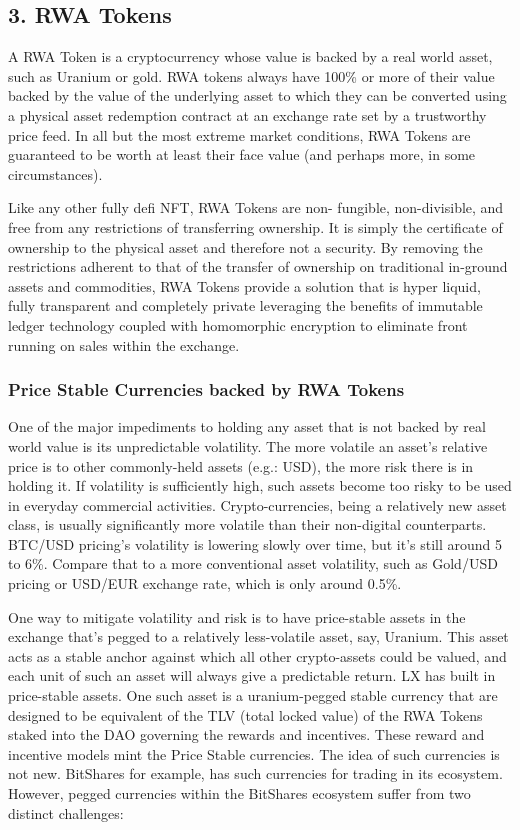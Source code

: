 \documentclass[11pt]{article}
\begin{document}
\subsection{3. RWA Tokens}

A RWA Token is a cryptocurrency whose value is backed by a real world asset, such as Uranium or gold. RWA tokens always have 100\% or more of their value backed by the value of the underlying asset to which they can be converted using a physical asset redemption contract at an exchange rate set by a trustworthy price feed. In all but the most extreme market conditions, RWA Tokens are guaranteed to be worth at least their face value (and perhaps more, in some circumstances).


Like any other fully defi NFT, RWA Tokens  are non- fungible, non-divisible, and free from any restrictions of transferring ownership. It is simply the certificate of ownership to the physical asset and therefore not a security. By removing the restrictions adherent to that of the transfer of ownership on traditional in-ground assets and commodities, RWA Tokens provide a solution that is hyper liquid, fully transparent and completely private leveraging the benefits of immutable ledger technology coupled with homomorphic encryption to eliminate front running on sales within the exchange.


\subsubsection{Price Stable Currencies backed by RWA Tokens}

One of the major impediments to holding any asset that is not backed by real world value is its unpredictable volatility. The more volatile an asset's relative price is to other commonly-held assets (e.g.: USD), the more risk there is in holding it. If volatility is sufficiently high, such assets become too risky to be used in everyday commercial activities. Crypto-currencies, being a relatively new asset class, is usually significantly more volatile than their non-digital counterparts. BTC/USD pricing's volatility is lowering slowly over time, but it's still around 5 to 6\%. Compare that to a more conventional asset volatility, such as Gold/USD pricing or USD/EUR exchange rate, which is only around 0.5\%.


One way to mitigate volatility and risk is to have price-stable assets in the exchange that's pegged to a relatively less-volatile asset, say, Uranium. This asset acts as a stable anchor against which all other crypto-assets could be valued, and each unit of such an asset will always give a predictable return. LX has built in price-stable assets. One such asset is a uranium-pegged stable currency that are designed to be equivalent of the TLV (total locked value) of the RWA Tokens staked into the DAO governing the rewards and incentives. These reward and incentive models mint the Price Stable currencies. The idea of such currencies is not new. BitShares for example, has such currencies for trading in its ecosystem. However, pegged currencies within the BitShares ecosystem suffer from two distinct challenges:
\end{document}
